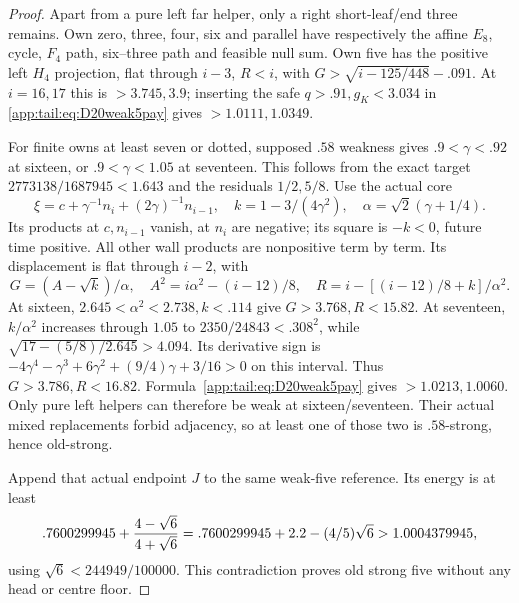 \documentclass[11pt]{article}
\theoremstyle{definition}
\theoremstyle{remark}
\begin{document}
\begin{proof}
Apart from a pure left far helper, only a right short-leaf/end
three remains. Own zero, three, four, six and parallel have
respectively the affine $E_8$, cycle, $F_4$ path, six--three
path and feasible null sum. Own five has the positive left
$H_4$ projection, flat through $i-3$, $R<i$, with
$G>\sqrt{i-125/448}-.091$.
At $i=16,17$ this is $>3.745,3.9$; inserting the safe
$q>.91,g_K<3.034$ in \eqref{app:tail:eq:D20weak5pay} gives
$>1.0111,1.0349$.

For finite owns at least seven or dotted, supposed $.58$
weakness gives $.9<\gamma<.92$ at sixteen, or
$.9<\gamma<1.05$ at seventeen. This follows from the exact
target $2773138/1687945<1.643$ and the residuals $1/2,5/8$.
Use the actual core
\[
 \xi=c+\gamma^{-1}n_i+(2\gamma)^{-1}n_{i-1},\quad
 k=1-3/(4\gamma^2),\quad \alpha=\sqrt2(\gamma+1/4).
\]
Its products at $c,n_{i-1}$ vanish, at $n_i$ are negative;
its square is $-k<0$, future time positive. All other wall
products are nonpositive term by term. Its displacement is
flat through $i-2$, with
\[
 G=(A-\sqrt k)/\alpha,
 \quad A^2=i\alpha^2-(i-12)/8,
 \quad R=i-[(i-12)/8+k]/\alpha^2.
\]
At sixteen, $2.645<\alpha^2<2.738,k<.114$ give
$G>3.768,R<15.82$. At seventeen,
$k/\alpha^2$ increases through $1.05$ to
$2350/24843<.308^2$, while
$\sqrt{17-(5/8)/2.645}>4.094$.
Its derivative sign is
$-4\gamma^4-\gamma^3+6\gamma^2+(9/4)\gamma+3/16>0$
on this interval. Thus $G>3.786,R<16.82$.
Formula~\eqref{app:tail:eq:D20weak5pay} gives $>1.0213,1.0060$.
Only pure left helpers can therefore be weak at sixteen/seventeen.
Their actual mixed replacements forbid adjacency, so at least one
of those two is $.58$-strong, hence old-strong.

Append that actual endpoint $J$ to the same weak-five reference.
Its energy is at least
\[
 .7600299945+{4-\sqrt6\over4+\sqrt6}
 =.7600299945+2.2-(4/5)\sqrt6
 >1.0004379945,
\]
using $\sqrt6<244949/100000$. This contradiction proves old
strong five without any head or centre floor.
\end{proof}
\end{document}
